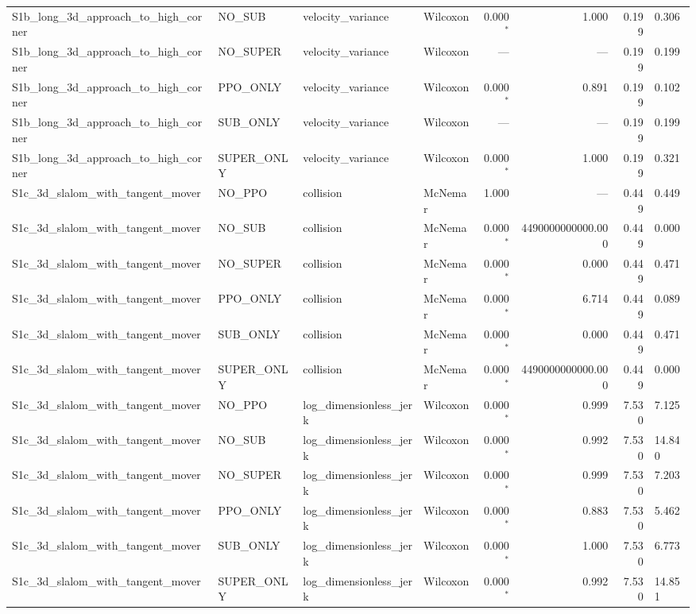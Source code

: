 \begin{tabular}{llllrrrl}
  S1b_long_3d_approach_to_high_corner & NO_SUB & velocity_variance & Wilcoxon & 0.000$^{*}$ & 1.000 & 0.199 & 0.306 \\
  S1b_long_3d_approach_to_high_corner & NO_SUPER & velocity_variance & Wilcoxon & --- & --- & 0.199 & 0.199 \\
  S1b_long_3d_approach_to_high_corner & PPO_ONLY & velocity_variance & Wilcoxon & 0.000$^{*}$ & 0.891 & 0.199 & 0.102 \\
  S1b_long_3d_approach_to_high_corner & SUB_ONLY & velocity_variance & Wilcoxon & --- & --- & 0.199 & 0.199 \\
  S1b_long_3d_approach_to_high_corner & SUPER_ONLY & velocity_variance & Wilcoxon & 0.000$^{*}$ & 1.000 & 0.199 & 0.321 \\
  S1c_3d_slalom_with_tangent_mover & NO_PPO & collision & McNemar & 1.000 & --- & 0.449 & 0.449 \\
  S1c_3d_slalom_with_tangent_mover & NO_SUB & collision & McNemar & 0.000$^{*}$ & 4490000000000.000 & 0.449 & 0.000 \\
  S1c_3d_slalom_with_tangent_mover & NO_SUPER & collision & McNemar & 0.000$^{*}$ & 0.000 & 0.449 & 0.471 \\
  S1c_3d_slalom_with_tangent_mover & PPO_ONLY & collision & McNemar & 0.000$^{*}$ & 6.714 & 0.449 & 0.089 \\
  S1c_3d_slalom_with_tangent_mover & SUB_ONLY & collision & McNemar & 0.000$^{*}$ & 0.000 & 0.449 & 0.471 \\
  S1c_3d_slalom_with_tangent_mover & SUPER_ONLY & collision & McNemar & 0.000$^{*}$ & 4490000000000.000 & 0.449 & 0.000 \\
  S1c_3d_slalom_with_tangent_mover & NO_PPO & log_dimensionless_jerk & Wilcoxon & 0.000$^{*}$ & 0.999 & 7.530 & 7.125 \\
  S1c_3d_slalom_with_tangent_mover & NO_SUB & log_dimensionless_jerk & Wilcoxon & 0.000$^{*}$ & 0.992 & 7.530 & 14.840 \\
  S1c_3d_slalom_with_tangent_mover & NO_SUPER & log_dimensionless_jerk & Wilcoxon & 0.000$^{*}$ & 0.999 & 7.530 & 7.203 \\
  S1c_3d_slalom_with_tangent_mover & PPO_ONLY & log_dimensionless_jerk & Wilcoxon & 0.000$^{*}$ & 0.883 & 7.530 & 5.462 \\
  S1c_3d_slalom_with_tangent_mover & SUB_ONLY & log_dimensionless_jerk & Wilcoxon & 0.000$^{*}$ & 1.000 & 7.530 & 6.773 \\
  S1c_3d_slalom_with_tangent_mover & SUPER_ONLY & log_dimensionless_jerk & Wilcoxon & 0.000$^{*}$ & 0.992 & 7.530 & 14.851 \\

\end{tabular}
